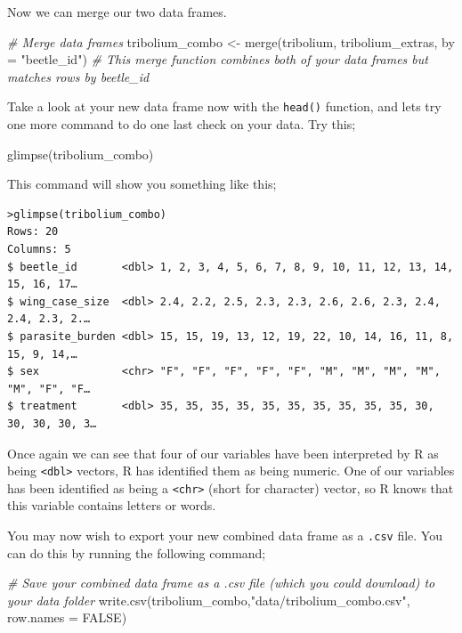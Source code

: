 \documentclass[
]{book}
\newenvironment{Shaded}{\begin{snugshade}}{\end{snugshade}}
\newcommand{\AttributeTok}[1]{\textcolor[rgb]{0.77,0.63,0.00}{#1}}
\newcommand{\CommentTok}[1]{\textcolor[rgb]{0.56,0.35,0.01}{\textit{#1}}}
\newcommand{\ConstantTok}[1]{\textcolor[rgb]{0.00,0.00,0.00}{#1}}
\newcommand{\FunctionTok}[1]{\textcolor[rgb]{0.00,0.00,0.00}{#1}}
\newcommand{\NormalTok}[1]{#1}
\newcommand{\OtherTok}[1]{\textcolor[rgb]{0.56,0.35,0.01}{#1}}
\newcommand{\StringTok}[1]{\textcolor[rgb]{0.31,0.60,0.02}{#1}}
\begin{document}
Now we can merge our two data frames.

\begin{Shaded}
\begin{Highlighting}[]
\CommentTok{\# Merge data frames}
\NormalTok{tribolium\_combo }\OtherTok{\textless{}{-}} \FunctionTok{merge}\NormalTok{(tribolium, tribolium\_extras, }\AttributeTok{by =} \StringTok{"beetle\_id"}\NormalTok{)}
\CommentTok{\# This merge function combines both of your data frames but matches rows by beetle\_id}
\end{Highlighting}
\end{Shaded}

Take a look at your new data frame now with the \texttt{head()} function, and lets try one more command to do one last check on your data. Try this;

\begin{Shaded}
\begin{Highlighting}[]
\FunctionTok{glimpse}\NormalTok{(tribolium\_combo)}
\end{Highlighting}
\end{Shaded}

This command will show you something like this;

\begin{verbatim}
>glimpse(tribolium_combo)
Rows: 20
Columns: 5
$ beetle_id       <dbl> 1, 2, 3, 4, 5, 6, 7, 8, 9, 10, 11, 12, 13, 14, 15, 16, 17…
$ wing_case_size  <dbl> 2.4, 2.2, 2.5, 2.3, 2.3, 2.6, 2.6, 2.3, 2.4, 2.4, 2.3, 2.…
$ parasite_burden <dbl> 15, 15, 19, 13, 12, 19, 22, 10, 14, 16, 11, 8, 15, 9, 14,…
$ sex             <chr> "F", "F", "F", "F", "F", "M", "M", "M", "M", "M", "F", "F…
$ treatment       <dbl> 35, 35, 35, 35, 35, 35, 35, 35, 35, 35, 30, 30, 30, 30, 3…
\end{verbatim}

Once again we can see that four of our variables have been interpreted by R as being \texttt{\textless{}dbl\textgreater{}} vectors, R has identified them as being numeric. One of our variables has been identified as being a \texttt{\textless{}chr\textgreater{}} (short for character) vector, so R knows that this variable contains letters or words.

You may now wish to export your new combined data frame as a \texttt{.csv} file. You can do this by running the following command;

\begin{Shaded}
\begin{Highlighting}[]
\CommentTok{\# Save your combined data frame as a .csv file (which you could download) to your data folder}
\FunctionTok{write.csv}\NormalTok{(tribolium\_combo,}\StringTok{"data/tribolium\_combo.csv"}\NormalTok{, }\AttributeTok{row.names =} \ConstantTok{FALSE}\NormalTok{)}
\end{Highlighting}
\end{Shaded}
\end{document}
